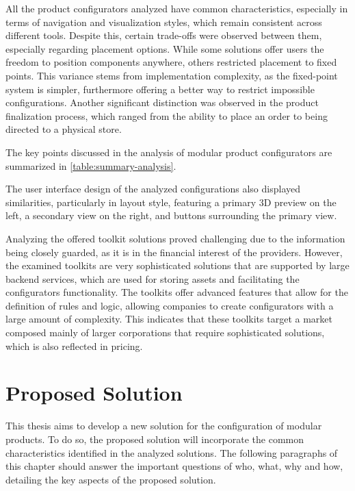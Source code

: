 All the product configurators analyzed have common characteristics, especially in terms of navigation and visualization styles, which remain consistent across different tools. Despite this, certain trade-offs were observed between them, especially regarding placement options. While some solutions offer users the freedom to position components anywhere, others restricted placement to fixed points. This variance stems from implementation complexity, as the fixed-point system is simpler, furthermore offering a better way to restrict impossible configurations.
Another significant distinction was observed in the product finalization process, which ranged from the ability to place an order to being directed to a physical store.

The key points discussed in the analysis of modular product configurators are summarized in \autoref{table:summary-analysis}.

The user interface design of the analyzed configurations also displayed similarities, particularly in layout style, featuring a primary 3D preview on the left, a secondary view on the right, and buttons surrounding the primary view.

Analyzing the offered toolkit solutions proved challenging due to the information being closely guarded, as it is in the financial interest of the providers. However, the examined toolkits are very sophisticated solutions that are supported by large backend services, which are used for storing assets and facilitating the configurators functionality. The toolkits offer advanced features that allow for the definition of rules and logic, allowing companies to create configurators with a large amount of complexity. This indicates that these toolkits target a market composed mainly of larger corporations that require sophisticated solutions, which is also reflected in pricing.

\section{Proposed Solution}

This thesis aims to develop a new solution for the configuration of modular products. To do so, the proposed solution will incorporate the common characteristics identified in the analyzed solutions. The following paragraphs of this chapter should answer the important questions of who, what, why and how, detailing the key aspects of the proposed solution. 

